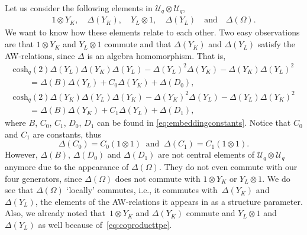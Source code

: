 \documentclass[pdftex]{sigma}
\numberwithin{equation}{section}
\newcommand{\chq}{\mathrm{cosh}_q}
\newcommand{\dyone}{\Delta\left(Y_{L}\right)}
\newcommand{\dyzero}{\Delta\left(Y_{K}\right)}
\newcommand{\Uq}{\mathcal{U}_q}
\newcommand{\yone}{Y_{L}\otimes 1}
\newcommand{\yzero}{1\otimes Y_{K}}
\begin{document}
Let us consider the following elements in $\Uq\otimes\Uq$,
\begin{gather*}
	1\otimes Y_{K},\quad \Delta(Y_{K}),\quad Y_{L}\otimes 1,\quad \Delta(Y_{L})\quad \text{and}\quad \Delta(\Omega).
\end{gather*}
We want to know how these elements relate to each other. Two easy observations are that $1\otimes Y_{K}$ and $Y_{L}\otimes 1$ commute and that $\Delta(Y_{K})$ and $\Delta(Y_{L})$ satisfy the AW-relations, since $\Delta$ is an algebra homomorphism. That is,
\begin{gather*}
\chq(2)\Delta(Y_{L})\Delta(Y_{K})\Delta(Y_{L}) - \Delta(Y_{L})^2\Delta(Y_{K})-\Delta(Y_{K})\Delta(Y_{L})^2 \\
\qquad{}=\Delta(B)\Delta(Y_{L}) + C_0\Delta(Y_{K}) + \Delta(D_0), \\
\chq(2)\Delta(Y_{K})\Delta(Y_{L})\Delta(Y_{K}) - \Delta(Y_{K})^2\Delta(Y_{L})-\Delta(Y_{L})\Delta(Y_{K})^2\\
\qquad{}=\Delta(B)\Delta(Y_{K}) + C_1\Delta(Y_{L}) + \Delta(D_1),
\end{gather*}
where $B$, $C_0$, $C_1$, $D_0$, $D_1$ can be found in \eqref{eq:embeddingconstants}. Notice that $C_0$ and $C_1$ are constants, thus
\[
\Delta(C_0)=C_0 (1\otimes 1)\ \text{ and }\ \Delta(C_1)=C_1 (1\otimes 1).
\]
However, $\Delta(B)$, $\Delta(D_0)$ and $\Delta(D_1)$ are not central elements of $\Uq\otimes \Uq$ anymore due to the appearance of $\Delta(\Omega)$. They do not even commute with our four generators,
since $\Delta(\Omega)$ does not commute with $1\otimes Y_{K}$ or $Y_{L}\otimes 1$. We do see that $\Delta(\Omega)$ `locally' commutes, i.e., it commutes with~$\dyzero$ and~$\dyone$, the elements of the AW-relations it appears in as a structure parameter. Also, we already noted that~$\yzero$ and $\dyzero$ commute and $\yone$ and $\dyone$ as well because of~\eqref{eq:coproducttpe}.
\end{document}
